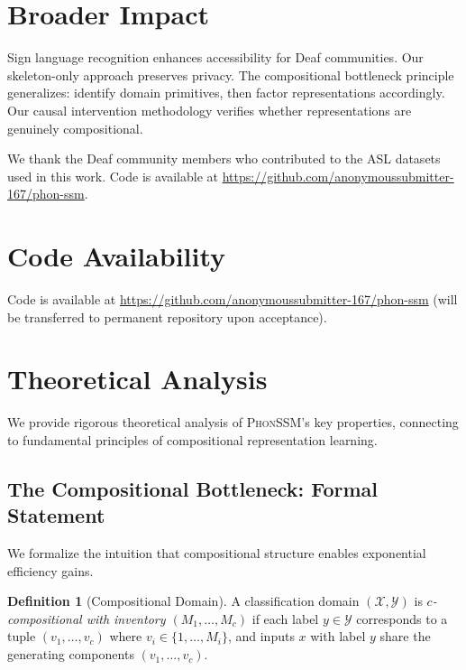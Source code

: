 \documentclass[sigconf,nonacm,anonymous]{acmart}
\theoremstyle{definition}
\newtheorem{definition}[theorem]{Definition}
\theoremstyle{remark}
\newcommand{\phonssm}{\textsc{PhonSSM}}
\begin{document}
\section*{Broader Impact}

Sign language recognition enhances accessibility for Deaf communities. Our skeleton-only approach preserves privacy. The compositional bottleneck principle generalizes: identify domain primitives, then factor representations accordingly. Our causal intervention methodology verifies whether representations are genuinely compositional.

\begin{acks}
We thank the Deaf community members who contributed to the ASL datasets used in this work. Code is available at \url{https://github.com/anonymoussubmitter-167/phon-ssm}.
\end{acks}




\newpage
\appendix

\section{Code Availability}
Code is available at \url{https://github.com/anonymoussubmitter-167/phon-ssm} (will be transferred to permanent repository upon acceptance).

\section{Theoretical Analysis}
\label{app:theory}

We provide rigorous theoretical analysis of \phonssm{}'s key properties, connecting to fundamental principles of compositional representation learning.

\subsection{The Compositional Bottleneck: Formal Statement}

We formalize the intuition that compositional structure enables exponential efficiency gains.

\begin{definition}[Compositional Domain]
A classification domain $(\mathcal{X}, \mathcal{Y})$ is \textit{$c$-compositional with inventory $(M_1, \ldots, M_c)$} if each label $y \in \mathcal{Y}$ corresponds to a tuple $(v_1, \ldots, v_c)$ where $v_i \in \{1, \ldots, M_i\}$, and inputs $x$ with label $y$ share the generating components $(v_1, \ldots, v_c)$.
\end{definition}
\end{document}
